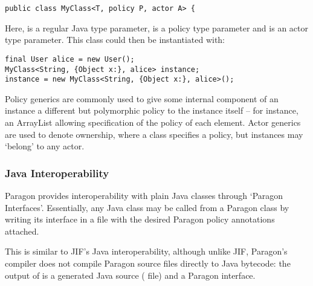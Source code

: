 \begin{verbatim}
public class MyClass<T, policy P, actor A> {
\end{verbatim}

Here,  is a regular Java type parameter,  is a policy type parameter and  is an actor type parameter. This class could then be instantiated with:

\begin{verbatim}
final User alice = new User();
MyClass<String, {Object x:}, alice> instance;
instance = new MyClass<String, {Object x:}, alice>();
\end{verbatim}

Policy generics are commonly used to give some internal component of an instance a different but polymorphic policy to the instance itself -- for instance, an ArrayList allowing specification of the policy of each element. Actor generics are used to denote ownership, where a class specifies a policy, but instances may `belong' to any actor.

\subsubsection{Java Interoperability}

Paragon provides interoperability with plain Java classes through `Paragon Interfaces'. Essentially, any Java class may be called from a Paragon class by writing its interface in a  file with the desired Paragon policy annotations attached.

This is similar to JIF's Java interoperability, although unlike JIF, Paragon's compiler does not compile Paragon source files directly to Java bytecode: the output of  is a generated Java source ( file) and a  Paragon interface.

